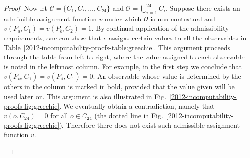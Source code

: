 \documentclass[%
 preprint,
 showpacs,
 showkeys,
 amsmath,
 amssymb,
 aps,
 pra,
 ]{revtex4-1}
\theoremstyle{definition}
\begin{document}
\begin{proof}
	Now let $\mathcal{C} = \{ C_1, C_2, \dots, C_{24} \}$ and $\mathcal{O} = \bigcup_{i = 1}^{24} C_i$.
	Suppose there exists an admissible assignment function $v$ under which $\mathcal{O}$ is non-contextual and $v(P_a, C_1) = v(P_b, C_2) = 1$.
	By continual application of the admissibility requirements, one can show that $v$ assigns certain values to all the observables in Table~\ref{2012-incomputability-proofs-table:greechie}.
	This argument proceeds through the table from left to right, where the value assigned to each observable is noted in the leftmost column.
	For example, in the first step we conclude that $v(P_\psi, C_1) = v(P_\phi, C_1) = 0$.
	An observable whose value is determined by the others in the column is marked in bold, provided that the value given will be used later on.
	This argument is also illustrated in Fig.~\ref{2012-incomputability-proofs-fig:greechie}.
	We eventually obtain a contradiction, namely that $v(o, C_{24}) = 0$ for all $o \in C_{24}$ (the dotted line in Fig.~\ref{2012-incomputability-proofs-fig:greechie}).
	Therefore there does not exist such admissible assignment function $v$.
	
	\begin{figure}
	\begin{center}
\end{center}
\end{figure}
\end{proof}
\end{document}
